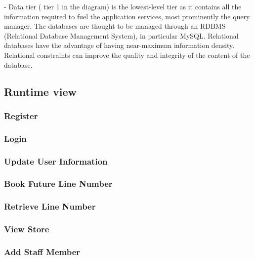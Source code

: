 - Data tier ( tier 1 in the diagram) is the lowest-level tier as it contains all the information required to fuel the
application services, most prominently the query manager. The
databases are thought to be managed through an RDBMS
(Relational Database Management System), in particular MySQL. Relational databases
have the advantage of having near-maximum information density.
Relational constraints can improve the quality and
integrity of the content of the database.

\subsection{Runtime view}

\subsubsection{Register} %
\subsubsection{Login}%
\subsubsection{Update User Information} %
\subsubsection{Book Future Line Number} %
\subsubsection{Retrieve Line Number} %
\subsubsection{View Store} %
\subsubsection{Add Staff Member}

